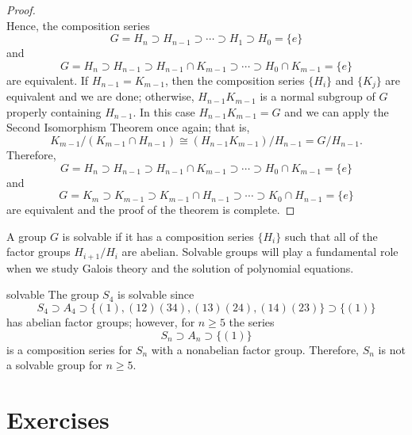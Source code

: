 \begin{proof}
\[\]
Hence, the composition series
\[
G = H_n \supset H_{n-1} \supset \cdots \supset H_1 \supset
H_0 = \{ e \} 
\]
and 
\[
G = H_n \supset H_{n-1} \supset H_{n-1} \cap K_{m-1} \supset 
\cdots \supset H_0 \cap K_{m-1} = \{ e \} 
\]
are equivalent. If $H_{n-1} = K_{m-1}$, then the composition series
$\{H_i \}$ and $\{ K_j \}$ are equivalent and we are done; otherwise,
$H_{n-1} K_{m-1}$  is a normal subgroup of $G$ properly containing
$H_{n-1}$.  In this case $H_{n-1} K_{m-1} = G$ and we can apply the
Second Isomorphism Theorem once again; that is,
\[
K_{m-1} / (K_{m-1} \cap H_{n-1}) \cong (H_{n-1} K_{m-1}) / H_{n-1} =
G/H_{n-1}.
\]
Therefore,
\[
G = H_n \supset H_{n-1} \supset H_{n-1} \cap K_{m-1} \supset 
\cdots \supset H_0 \cap K_{m-1} = \{ e \}
\]
and 
\[
G = K_m \supset K_{m-1} \supset K_{m-1} \cap H_{n-1} \supset 
\cdots \supset K_0 \cap H_{n-1} = \{ e \}
\]
are equivalent and the proof of the theorem is complete.
\end{proof}
 
 
\medskip
 
 
A group $G$ is {\bfi solvable\/} if it has 
a composition series $\{ H_i \}$ such that all of the factor groups 
$H_{i+1} / H_i$ are abelian. Solvable groups will play a fundamental 
role when we study Galois theory and the solution of polynomial 
equations. 
 
 
 
\begin{example}{solvable}
The group $S_4$ is solvable since
\[
S_4 \supset A_4 \supset \{ (1), (12)(34), (13)(24), (14)(23) \} 
\supset \{ (1) \}
\]
has abelian factor groups; however, for $n \geq 5$ the series
\[
S_n \supset A_n \supset \{ (1) \}
\]
is a composition series for $S_n$ with a nonabelian factor group.
Therefore, $S_n$ is not a solvable group for $n \geq 5$. 
\end{example}
 
 
 
 
\section*{Exercises}
\exrule
 
 
 

